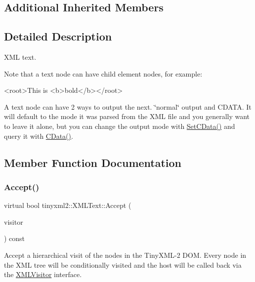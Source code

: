 \subsection*{Additional Inherited Members}


\subsection{Detailed Description}
X\+ML text.

Note that a text node can have child element nodes, for example\+: \begin{DoxyVerb}<root>This is <b>bold</b></root>
\end{DoxyVerb}


A text node can have 2 ways to output the next. \char`\"{}normal\char`\"{} output and C\+D\+A\+TA. It will default to the mode it was parsed from the X\+ML file and you generally want to leave it alone, but you can change the output mode with \mbox{\hyperlink{classtinyxml2_1_1XMLText_ad080357d76ab7cc59d7651249949329d}{Set\+C\+Data()}} and query it with \mbox{\hyperlink{classtinyxml2_1_1XMLText_ac1bb5ea4166c320882d9e0ad16fd385b}{C\+Data()}}. 

\subsection{Member Function Documentation}
\mbox{\label{classtinyxml2_1_1XMLText_a1b2c1448f1a21299d0a7913f18b55206}} 
\subsubsection{\texorpdfstring{Accept()}{Accept()}}
{\footnotesize\ttfamily virtual bool tinyxml2\+::\+X\+M\+L\+Text\+::\+Accept (\begin{DoxyParamCaption}\item[{\mbox{\hyperlink{classtinyxml2_1_1XMLVisitor}{X\+M\+L\+Visitor}} $\ast$}]{visitor }\end{DoxyParamCaption}) const\hspace{0.3cm}{\ttfamily [virtual]}}

Accept a hierarchical visit of the nodes in the Tiny\+X\+M\+L-\/2 D\+OM. Every node in the X\+ML tree will be conditionally visited and the host will be called back via the \mbox{\hyperlink{classtinyxml2_1_1XMLVisitor}{X\+M\+L\+Visitor}} interface.

